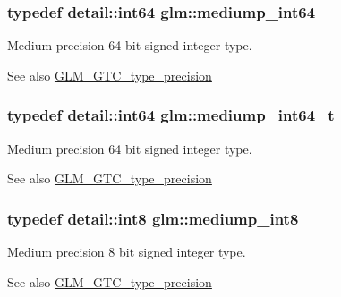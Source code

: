 \subsubsection[{\texorpdfstring{mediump\+\_\+int64}{mediump_int64}}]{\setlength{\rightskip}{0pt plus 5cm}typedef detail\+::int64 {\bf glm\+::mediump\+\_\+int64}}\hypertarget{group__gtc__type__precision_ga603c695fe5cd677d3f72a81343e19a74}{}\label{group__gtc__type__precision_ga603c695fe5cd677d3f72a81343e19a74}
Medium precision 64 bit signed integer type. \begin{DoxySeeAlso}{See also}
\hyperlink{group__gtc__type__precision}{G\+L\+M\+\_\+\+G\+T\+C\+\_\+type\+\_\+precision} 
\end{DoxySeeAlso}
\subsubsection[{\texorpdfstring{mediump\+\_\+int64\+\_\+t}{mediump_int64_t}}]{\setlength{\rightskip}{0pt plus 5cm}typedef detail\+::int64 {\bf glm\+::mediump\+\_\+int64\+\_\+t}}\hypertarget{group__gtc__type__precision_ga555a2f85641550c232db473a9bb981f7}{}\label{group__gtc__type__precision_ga555a2f85641550c232db473a9bb981f7}
Medium precision 64 bit signed integer type. \begin{DoxySeeAlso}{See also}
\hyperlink{group__gtc__type__precision}{G\+L\+M\+\_\+\+G\+T\+C\+\_\+type\+\_\+precision} 
\end{DoxySeeAlso}
\subsubsection[{\texorpdfstring{mediump\+\_\+int8}{mediump_int8}}]{\setlength{\rightskip}{0pt plus 5cm}typedef detail\+::int8 {\bf glm\+::mediump\+\_\+int8}}\hypertarget{group__gtc__type__precision_ga3ee8faab2278c44c5785af04b7b18a14}{}\label{group__gtc__type__precision_ga3ee8faab2278c44c5785af04b7b18a14}
Medium precision 8 bit signed integer type. \begin{DoxySeeAlso}{See also}
\hyperlink{group__gtc__type__precision}{G\+L\+M\+\_\+\+G\+T\+C\+\_\+type\+\_\+precision} 
\end{DoxySeeAlso}
